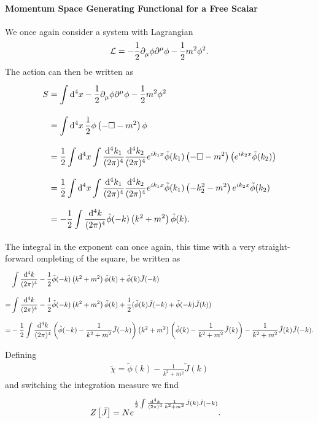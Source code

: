 \paragraph{Momentum Space Generating Functional for a Free Scalar}
We once again consider a system with Lagrangian
\begin{align*}
	\mathcal{L} = -\frac{1}{2}\partial^{}_{\mu}\phi\partial^{\mu}_{}\phi - \frac{1}{2}m^{2}\phi^{2}.
\end{align*}
The action can then be written as
\begin{align*}
	S &= \int\limits_{}^{}\dd[4]{x}-\frac{1}{2}\partial^{}_{\mu}\phi\partial^{\mu}_{}\phi - \frac{1}{2}m^{2}\phi^{2} \\
	  &= \int\limits_{}^{}\dd[4]{x}\frac{1}{2}\phi\left(-\square - m^{2}\right)\phi \\
	  &= \frac{1}{2}\int\limits_{}^{}\dd[4]{x}\int\limits_{}^{}\frac{\dd[4]{k_{1}}}{(2\pi)^{4}}\frac{\dd[4]{k_{2}}}{(2\pi)^{4}}e^{ik_{1}x}\tilde{\phi}(k_{1})\left(-\square - m^{2}\right)\left(e^{ik_{2}x}\tilde{\phi}(k_{2})\right) \\
	  &= \frac{1}{2}\int\limits_{}^{}\dd[4]{x}\int\limits_{}^{}\frac{\dd[4]{k_{1}}}{(2\pi)^{4}}\frac{\dd[4]{k_{2}}}{(2\pi)^{4}}e^{ik_{1}x}\tilde{\phi}(k_{1})\left(-k_{2}^{2} - m^{2}\right)e^{ik_{2}x}\tilde{\phi}(k_{2}) \\
	  &= -\frac{1}{2}\int\limits_{}^{}\frac{\dd[4]{k}}{(2\pi)^{4}}\tilde{\phi}(-k)\left(k^{2} + m^{2}\right)\tilde{\phi}(k).
\end{align*}
The integral in the exponent can once again, this time with a very straight-forward ompleting of the square, be written as
\begin{align*}
	 &\int\limits_{}^{}\frac{\dd[4]{k}}{(2\pi)^{4}}-\frac{1}{2}\tilde{\phi}(-k)\left(k^{2} + m^{2}\right)\tilde{\phi}(k) + \tilde{\phi}(k)\tilde{J}(-k) \\
	=& \int\limits_{}^{}\frac{\dd[4]{k}}{(2\pi)^{4}}-\frac{1}{2}\tilde{\phi}(-k)\left(k^{2} + m^{2}\right)\tilde{\phi}(k) + \frac{1}{2}(\tilde{\phi}(k)\tilde{J}(-k) + \tilde{\phi}(-k)\tilde{J}(k)) \\
	=& -\frac{1}{2}\int\limits_{}^{}\frac{\dd[4]{k}}{(2\pi)^{4}}\left(\tilde{\phi}(-k) - \frac{1}{k^{2} + m^{2}}\tilde{J}(-k)\right)\left(k^{2} + m^{2}\right)\left(\tilde{\phi}(k) - \frac{1}{k^{2} + m^{2}}\tilde{J}(k)\right) - \frac{1}{k^{2} + m^{2}}\tilde{J}(k)\tilde{J}(-k).
\end{align*}
Defining
\begin{align*}
	\tilde{\chi} = \tilde{\phi}(k) - \frac{1}{k^{2} + m^{2}}\tilde{J}(k)
\end{align*}
and switching the integration measure we find
\begin{align*}
	Z\left[\tilde{J}\right] &= Ne^{\frac{i}{2}\int\limits_{}^{}\frac{\dd[4]{k}}{(2\pi)^{4}}\frac{1}{k^{2} + m^{2}}\tilde{J}(k)\tilde{J}(-k)}.
\end{align*}

